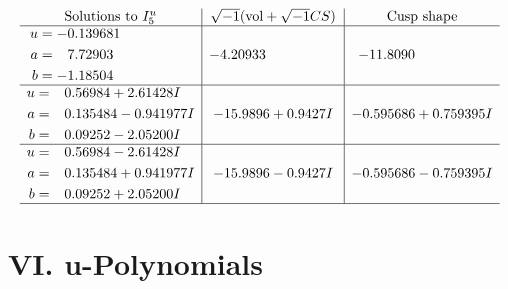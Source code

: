 \documentclass[1p]{elsarticle_modified}
\theoremstyle{definition}
\newcommand{\I}{\sqrt{-1}}
\begin{document}
$$\begin{array}{c|c|c}  
\text{Solutions to }I^u_{5}& \I (\text{vol} + \sqrt{-1}CS) & \text{Cusp shape}\\
 \hline 
\begin{aligned}
u &= -0.139681\phantom{ +0.000000I} \\
a &= \phantom{-}7.72903\phantom{ +0.000000I} \\
b &= -1.18504\phantom{ +0.000000I}\end{aligned}
 & -4.20933\phantom{ +0.000000I} & -11.8090\phantom{ +0.000000I} \\ \hline\begin{aligned}
u &= \phantom{-}0.56984 + 2.61428 I \\
a &= \phantom{-}0.135484 - 0.941977 I \\
b &= \phantom{-}0.09252 - 2.05200 I\end{aligned}
 & -15.9896 + 0.9427 I & -0.595686 + 0.759395 I \\ \hline\begin{aligned}
u &= \phantom{-}0.56984 - 2.61428 I \\
a &= \phantom{-}0.135484 + 0.941977 I \\
b &= \phantom{-}0.09252 + 2.05200 I\end{aligned}
 & -15.9896 - 0.9427 I & -0.595686 - 0.759395 I\\
 \hline 
 \end{array}$$\newpage
\newpage\renewcommand{\arraystretch}{1}
\centering \section*{ VI. u-Polynomials}
\end{document}
